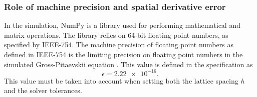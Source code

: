 \subsubsection{Role of machine precision and spatial derivative error}
In the simulation, NumPy is a library used for performing mathematical and matrix operations. The library relies on 64-bit floating point numbers, as specified by IEEE-754. The machine precision of floating point numbers as defined in IEEE-754 is the limiting precision on floating point numbers in the simulated Gross-Pitaevskii equation \cite{1985--ieee754}. This value is defined in the specification as \begin{equation}
	\epsilon = \num{2.22e-16}.
\end{equation}
This value must be taken into account when setting both the lattice spacing $h$ and the solver tolerances.
